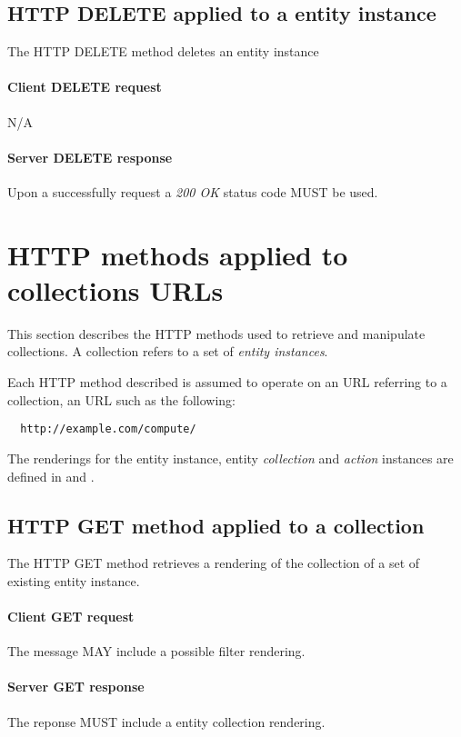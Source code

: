 \documentclass[10pt,a4paper]{article}
\begin{document}
\subsection{HTTP DELETE applied to a entity instance}
The HTTP DELETE method deletes an entity instance

\paragraph{Client DELETE request}
N/A

\paragraph{Server DELETE response}
Upon a successfully request a \emph{200 OK} status code MUST be used.

\section{HTTP methods applied to collections URLs}
This section describes the HTTP methods used to retrieve and manipulate
collections. A collection refers to a set of {\em entity instances}.

Each HTTP method described is assumed to operate
on an URL referring to a collection, an URL such as the following:
\begin{verbatim}
  http://example.com/compute/
\end{verbatim}

The renderings for the entity instance, entity {\em collection} and {\em action} instances are defined in \cite{occi:text} and \cite{occi:json}.

\subsection{HTTP GET method applied to a collection}
The HTTP GET method retrieves a rendering of the collection of a set of existing entity instance.

\paragraph{Client GET request}
The message MAY include a possible filter rendering.

\paragraph{Server GET response}
The reponse MUST include a entity collection rendering.
\end{document}
